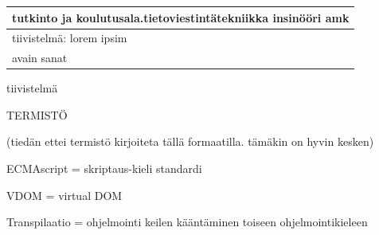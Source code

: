 \documentclass[11pt,a4paper,titlepage,oneside]{article}
\begin{document}
\begin{tabular}{ | l | }
    \begin{minipage}[t][1.5cm][t]{10cm}
    tutkinto ja koulutusala.\newline  tietoviestintätekniikka insinööri amk  

    \end{minipage}\\ \hline

    \begin{minipage}[t][7cm][t]{5cm}
    tiivistelmä: \newline lorem ipsim
    \end{minipage}\\ \hline

    \begin{minipage}[t][2cm][t]{5cm}
    avain sanat
    \end{minipage}\\ \hline

\end{tabular}

\newpage




tiivistelmä








\newpage



\setcounter{page}{0}
\pagestyle{empty}

\tableofcontents





\newpage





TERMISTÖ
\bigskip

(tiedän ettei termistö kirjoiteta tällä formaatilla. tämäkin on hyvin kesken)
\bigskip
 
ECMAscript = skriptaus-kieli standardi 
\bigskip

VDOM = virtual DOM
\bigskip

Transpilaatio = ohjelmointi keilen kääntäminen toiseen ohjelmointikieleen
\bigskip
\end{document}
